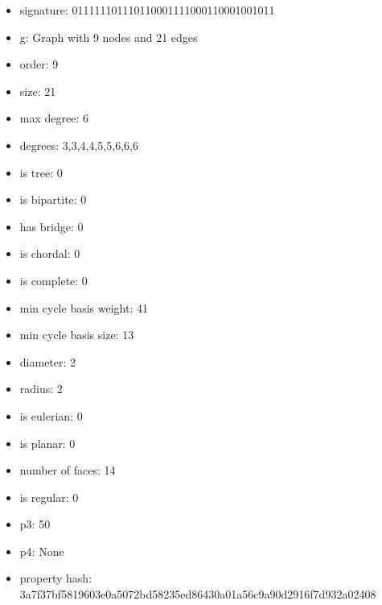 \newpage
\begin{figure}
\end{figure}
\begin{itemize}
\item signature: 011111101110110001111000110001001011
\item g: Graph with 9 nodes and 21 edges
\item order: 9
\item size: 21
\item max degree: 6
\item degrees: 3,3,4,4,5,5,6,6,6
\item is tree: 0
\item is bipartite: 0
\item has bridge: 0
\item is chordal: 0
\item is complete: 0
\item min cycle basis weight: 41
\item min cycle basis size: 13
\item diameter: 2
\item radius: 2
\item is eulerian: 0
\item is planar: 0
\item number of faces: 14
\item is regular: 0
\item p3: 50
\item p4: None
\item property hash: 3a7f37bf5819603e0a5072bd58235ed86430a01a56c9a90d2916f7d932a02408
\end{itemize}
